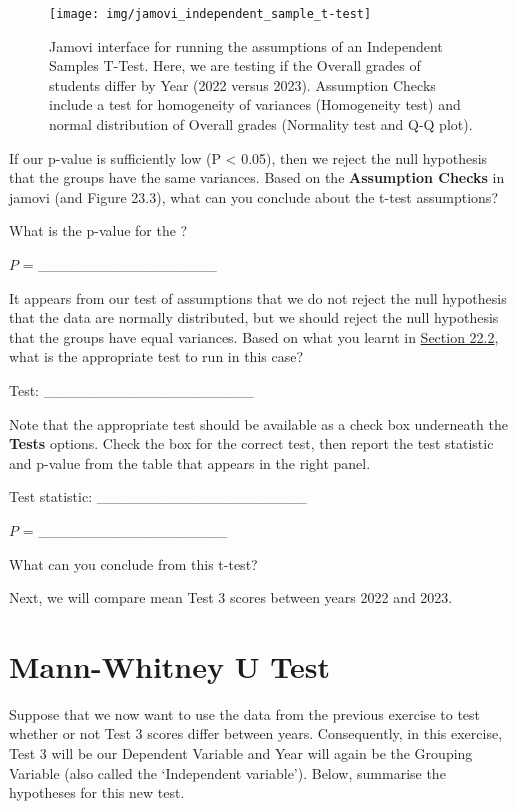 \documentclass[
  openany]{krantz}
\begin{document}
\begin{figure}
\texttt{[image: img/jamovi\_independent\_sample\_t-test]} \caption{Jamovi interface for running the assumptions of an Independent Samples T-Test. Here, we are testing if the Overall grades of students differ by Year (2022 versus 2023). Assumption Checks include a test for homogeneity of variances (Homogeneity test) and normal distribution of Overall grades (Normality test and Q-Q plot).}\label{fig:unnamed-chunk-92}
\end{figure}

If our p-value is sufficiently low (P \textless{} 0.05), then we reject the null hypothesis that the groups have the same variances.
Based on the \textbf{Assumption Checks} in jamovi (and Figure 23.3), what can you conclude about the t-test assumptions?

\newpage

What is the p-value for the ?

\(P\) = \_\_\_\_\_\_\_\_\_\_\_\_\_\_\_\_\_

It appears from our test of assumptions that we do not reject the null hypothesis that the data are normally distributed, but we should reject the null hypothesis that the groups have equal variances.
Based on what you learnt in \protect\hyperlink{independent-samples-t-test}{Section 22.2}, what is the appropriate test to run in this case?

Test: \_\_\_\_\_\_\_\_\_\_\_\_\_\_\_\_\_\_\_\_

Note that the appropriate test should be available as a check box underneath the \textbf{Tests} options.
Check the box for the correct test, then report the test statistic and p-value from the table that appears in the right panel.

Test statistic: \_\_\_\_\_\_\_\_\_\_\_\_\_\_\_\_\_\_\_\_

\(P\) = \_\_\_\_\_\_\_\_\_\_\_\_\_\_\_\_\_\_

What can you conclude from this t-test?

\newpage

Next, we will compare mean Test 3 scores between years 2022 and 2023.

\hypertarget{mann-whitney-u-test-1}{%
\section{Mann-Whitney U Test}\label{mann-whitney-u-test-1}}

Suppose that we now want to use the data from the previous exercise to test whether or not Test 3 scores differ between years.
Consequently, in this exercise, Test 3 will be our Dependent Variable and Year will again be the Grouping Variable (also called the `Independent variable').
Below, summarise the hypotheses for this new test.
\end{document}
